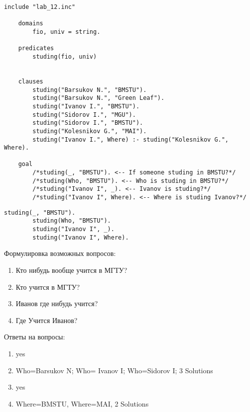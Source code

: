\documentclass[../main.tex]{subfile}
\begin{document}
	\begin{lstlisting}[frame=single, caption=код программы, label=list:list1]
	include "lab_12.inc"
	
	domains
		fio, univ = string.
	
	predicates
		studing(fio, univ)
	
	
	clauses
		studing("Barsukov N.", "BMSTU").
		studing("Barsukov N.", "Green Leaf").
		studing("Ivanov I.", "BMSTU").
		studing("Sidorov I.", "MGU").
		studing("Sidorov I.", "BMSTU").
		studing("Kolesnikov G.", "MAI").
		studing("Ivanov I.", Where) :- studing("Kolesnikov G.", Where).
	
	goal
		/*studing(_, "BMSTU"). <-- If someone studing in BMSTU?*/
		/*studing(Who, "BMSTU"). <-- Who is studing in BMSTU?*/
		/*studing("Ivanov I", _). <-- Ivanov is studing?*/
		/*studing("Ivanov I", Where). <-- Where is studing Ivanov?*/
	\end{lstlisting}

	\begin{lstlisting}[caption=Возможные варианты вопросов к базе, label=list:list2]
		studing(_, "BMSTU").
		studing(Who, "BMSTU").
		studing("Ivanov I", _).
		studing("Ivanov I", Where).
	\end{lstlisting}
	
	Формулировка возможных вопросов: 
	\begin{enumerate}[1)]
		\item Кто нибудь вообще учится в МГТУ?
		\item Кто учится в МГТУ?
		\item Иванов где нибудь учится?
		\item Где Учится Иванов?
	\end{enumerate}

	Ответы на вопросы:
	\begin{enumerate}
		\item yes
		\item Who=Barsukov N; Who= Ivanov I; Who=Sidorov I; 3 Solutions
		\item yes
		\item Where=BMSTU, Where=MAI, 2 Solutions
		
	\end{enumerate}
	
\end{document}

